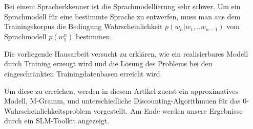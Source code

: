 Bei einem Spracherkkenner ist die Sprachmodellierung sehr schwer. Um ein Sprachmodell f\"ur eine bestimmte Sprache zu entwerfen, muss man aus dem Trainingskorpus die Bedingung Wahrscheinlichkeit $p(w_{n}|w_{1},..w_{n-1})$   vom Sprachmodell $p(w_{1}^n)$   bestimmen.

Die vorliegende Hausarbeit versucht zu erkl\"aren, wie ein realisierbares Modell durch Training erzeugt wird und die L\"osung des Problems bei den eingeschr\"ankten Trainingdatenbasen erreicht wird. 

Um diese zu erreichen, werden in diesem Artikel zuerst ein approximatives Modell, M-Gramm, und unterschiedliche Discounting-Algorithmuen f\"ur das 0-Wahrscheinlichkeitsproblem vorgestellt. Am Ende werden unsere Ergebnisse durch ein SLM-Toolkit angezeigt.
